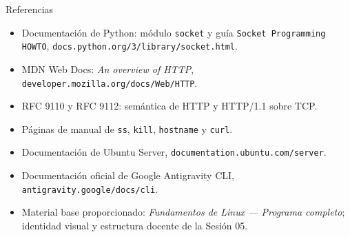 \documentclass[aspectratio=169,10pt,c]{beamer}
\begin{document}
\begin{frame}{Referencias}
\scriptsize
\begin{itemize}\setlength\itemsep{3pt}
  \item Documentación de Python: módulo \texttt{socket} y guía \texttt{Socket Programming HOWTO}, \texttt{docs.python.org/3/library/socket.html}.
  \item MDN Web Docs: \emph{An overview of HTTP}, \texttt{developer.mozilla.org/docs/Web/HTTP}.
  \item RFC 9110 y RFC 9112: semántica de HTTP y HTTP/1.1 sobre TCP.
  \item Páginas de manual de \texttt{ss}, \texttt{kill}, \texttt{hostname} y \texttt{curl}.
  \item Documentación de Ubuntu Server, \texttt{documentation.ubuntu.com/server}.
  \item Documentación oficial de Google Antigravity CLI, \texttt{antigravity.google/docs/cli}.
  \item Material base proporcionado: \emph{Fundamentos de Linux — Programa completo}; identidad visual y estructura docente de la Sesión 05.
\end{itemize}
\end{frame}
\end{document}
